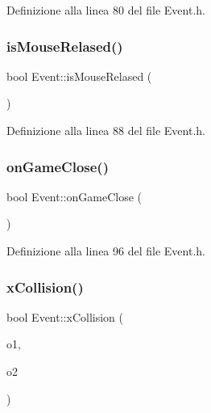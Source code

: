 Definizione alla linea 80 del file Event.\+h.

\mbox{\label{class_event_a34ef498a16a479389c36bd6fb4003124}} 
\subsubsection{\texorpdfstring{is\+Mouse\+Relased()}{isMouseRelased()}}
{\footnotesize\ttfamily bool Event\+::is\+Mouse\+Relased (\begin{DoxyParamCaption}{ }\end{DoxyParamCaption})\hspace{0.3cm}{\ttfamily [inline]}}



Definizione alla linea 88 del file Event.\+h.

\mbox{\label{class_event_a16c21ad8dd851778c3755299812e59cb}} 
\subsubsection{\texorpdfstring{on\+Game\+Close()}{onGameClose()}}
{\footnotesize\ttfamily bool Event\+::on\+Game\+Close (\begin{DoxyParamCaption}{ }\end{DoxyParamCaption})\hspace{0.3cm}{\ttfamily [inline]}}



Definizione alla linea 96 del file Event.\+h.

\mbox{\label{class_event_aa3cbc8415875fe920b17f86ddc8b854e}} 
\subsubsection{\texorpdfstring{x\+Collision()}{xCollision()}}
{\footnotesize\ttfamily bool Event\+::x\+Collision (\begin{DoxyParamCaption}\item[{\hyperlink{class_game_object}{Game\+Object} $\ast$}]{o1,  }\item[{\hyperlink{class_game_object}{Game\+Object} $\ast$}]{o2 }\end{DoxyParamCaption})\hspace{0.3cm}{\ttfamily [inline]}}



